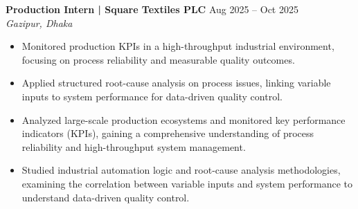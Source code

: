 \noindent
{\noindent\fontsize{12pt}{15pt}\bfseries Production Intern | Square Textiles PLC} \hfill Aug 2025 -- Oct 2025 \\
{\fontsize{10pt}{12pt}\textit{Gazipur, Dhaka}}
\begin{itemize}
\ifsqa
    \item Monitored production KPIs in a high-throughput industrial environment, focusing on process reliability and measurable quality outcomes.
    \item Applied structured root-cause analysis on process issues, linking variable inputs to system performance for data-driven quality control.
\else
    \item Analyzed large-scale production ecosystems and monitored key performance indicators (KPIs), gaining a comprehensive understanding of process reliability and high-throughput system management.
    \item Studied industrial automation logic and root-cause analysis methodologies, examining the correlation between variable inputs and system performance to understand data-driven quality control.
\fi
\end{itemize}
